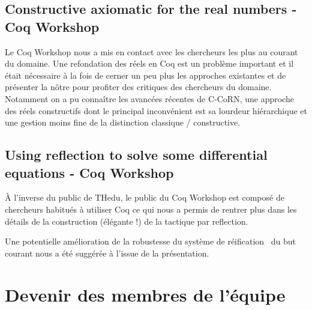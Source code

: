 \documentclass[11pt]{article}
\begin{document}
\subsection{Constructive axiomatic for the real numbers - Coq Workshop}

Le Coq Workshop nous a mis en contact avec les chercheurs les plus au courant du domaine. Une refondation des réels en Coq est un problème important et il était nécessaire à la fois de cerner un peu plus les approches existantes et de présenter la nôtre pour profiter des critiques des chercheurs du domaine. Notamment on a pu connaître les avancées récentes de C-CoRN, une approche des réels constructifs dont le principal inconvénient est sa lourdeur hiérarchique et une gestion moins fine de la distinction classique / constructive.

\subsection{Using reflection to solve some differential equations - Coq Workshop}

À l'inverse du public de THedu, le public du Coq Workshop est composé de chercheurs
habitués à utiliser Coq ce qui nous a permis de rentrer plus dans les détails de la
construction (élégante !) de la tactique par reflection.

Une potentielle amélioration de la robustesse du système de réification~\cite{adhoc}
du but courant nous a été suggérée à l'issue de la présentation.

\section{Devenir des membres de l'équipe}





\end{document}
